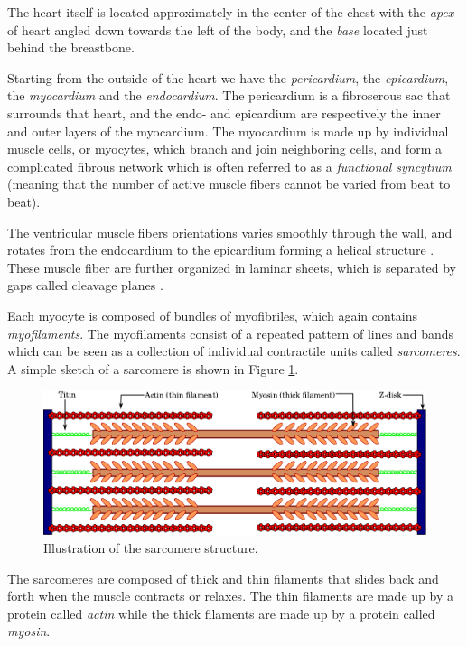 The heart itself is located approximately in the center of the chest
with the \emph{apex} of heart angled down towards the left of the
body, and the \emph{base} located just behind the breastbone.


Starting from the outside of the heart we have the \emph{pericardium},
the \emph{epicardium}, the \emph{myocardium} and the \emph{endocardium}. 
The pericardium is a fibroserous sac that surrounds that heart, and
the endo- and epicardium are respectively the inner and outer layers
of the myocardium. The myocardium is made up by individual muscle cells, or
myocytes, which branch and join neighboring cells, and form a
complicated fibrous network which is often referred to as a 
\emph{functional syncytium} (meaning that the number of active muscle
fibers cannot be varied from beat to beat).

The ventricular muscle fibers orientations varies smoothly through the
wall, and rotates from the endocardium to the epicardium forming a
helical structure \cite{streeter1969fiber}. These muscle fiber are
further organized in laminar sheets, which is separated by gaps called
cleavage planes \cite{legrice1995laminar}.

Each myocyte is composed of bundles of myofibriles, which again contains
\emph{myofilaments}. The myofilaments consist of a repeated pattern
of lines and bands which can be seen as a collection of individual
contractile units called \emph{sarcomeres}. A simple sketch of a
sarcomere is shown in Figure \ref{fig:sarcomere}. 
\begin{figure}[htbp]
  \centering
    \includegraphics{chapters/introduction/figures/Sarcomere}
\caption{Illustration of the sarcomere structure.}
\label{fig:sarcomere}
\end{figure}

The sarcomeres are composed of thick and thin filaments that slides
back and forth when the muscle contracts or relaxes.
The thin filaments are made up by a protein called \emph{actin} while
the thick filaments are made up by a protein called \emph{myosin}.



